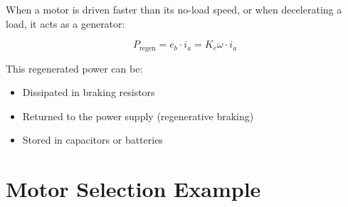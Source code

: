 When a motor is driven faster than its no-load speed, or when decelerating a load, it acts as a generator:

\begin{equation}
P_{\text{regen}} = e_b \cdot i_a = K_e\omega \cdot i_a
\end{equation}

This regenerated power can be:
\begin{itemize}
    \item Dissipated in braking resistors
    \item Returned to the power supply (regenerative braking)
    \item Stored in capacitors or batteries
\end{itemize}

\section{Motor Selection Example}
\label{sec:motor_selection}

